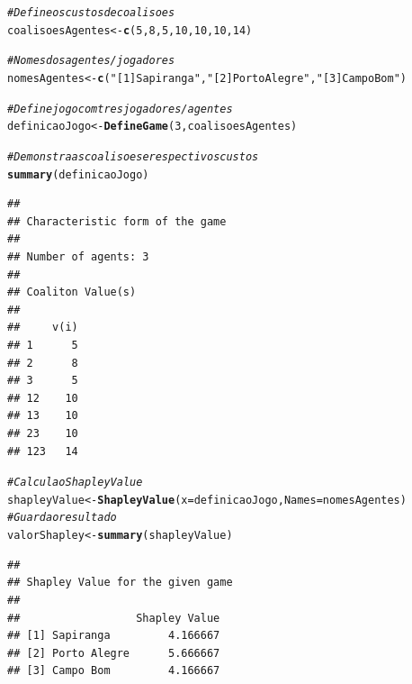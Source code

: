\documentclass[
	article,			        %
	11pt,				          %
	oneside,			        %
	a4paper,			        %
	english,			        %
	brazil,				        %
	sumario=tradicional
]{abntex2}\usepackage[]{graphicx}\usepackage[]{color}
\makeatletter
\newcommand{\hlnum}[1]{\textcolor[rgb]{0.686,0.059,0.569}{#1}}%
\newcommand{\hlstr}[1]{\textcolor[rgb]{0.192,0.494,0.8}{#1}}%
\newcommand{\hlcom}[1]{\textcolor[rgb]{0.678,0.584,0.686}{\textit{#1}}}%
\newcommand{\hlstd}[1]{\textcolor[rgb]{0.345,0.345,0.345}{#1}}%
\newcommand{\hlkwb}[1]{\textcolor[rgb]{0.69,0.353,0.396}{#1}}%
\newcommand{\hlkwc}[1]{\textcolor[rgb]{0.333,0.667,0.333}{#1}}%
\newcommand{\hlkwd}[1]{\textcolor[rgb]{0.737,0.353,0.396}{\textbf{#1}}}%
\newenvironment{kframe}{%
 \def\at@end@of@kframe{}%
 \ifinner\ifhmode%
  \def\at@end@of@kframe{\end{minipage}}%
  \begin{minipage}{\columnwidth}%
 \fi\fi%
 \def\FrameCommand##1{\hskip\@totalleftmargin \hskip-\fboxsep
 \colorbox{shadecolor}{##1}\hskip-\fboxsep
     \hskip-\linewidth \hskip-\@totalleftmargin \hskip\columnwidth}%
 \MakeFramed {\advance\hsize-\width
   \@totalleftmargin\z@ \linewidth\hsize
   \@setminipage}}%
 {\par\unskip\endMakeFramed%
 \at@end@of@kframe}
\newenvironment{knitrout}{}{} %
\makeatother
\begin{document}
\begin{knitrout}
\color{fgcolor}\begin{kframe}
\begin{alltt}
\hlcom{# Define os custos de coalisoes}
\hlstd{coalisoesAgentes} \hlkwb{<-} \hlkwd{c}\hlstd{(}\hlnum{5}\hlstd{,} \hlnum{8}\hlstd{,} \hlnum{5}\hlstd{,} \hlnum{10}\hlstd{,} \hlnum{10}\hlstd{,} \hlnum{10}\hlstd{,} \hlnum{14}\hlstd{)}

\hlcom{# Nomes dos agentes/jogadores}
\hlstd{nomesAgentes} \hlkwb{<-} \hlkwd{c}\hlstd{(}\hlstr{"[1] Sapiranga"}\hlstd{,}\hlstr{"[2] Porto Alegre"}\hlstd{,}\hlstr{"[3] Campo Bom"}\hlstd{)}

\hlcom{# Define jogo com tres jogadores/agentes}
\hlstd{definicaoJogo}   \hlkwb{<-} \hlkwd{DefineGame}\hlstd{(}\hlnum{3}\hlstd{, coalisoesAgentes)}

\hlcom{# Demonstra as coalisoes e respectivos custos}
\hlkwd{summary}\hlstd{(definicaoJogo)}
\end{alltt}
\begin{verbatim}
## 
## Characteristic form of the game 
## 
## Number of agents: 3 
## 
## Coaliton Value(s) 
## 
##     v(i)
## 1      5
## 2      8
## 3      5
## 12    10
## 13    10
## 23    10
## 123   14
\end{verbatim}
\begin{alltt}
\hlcom{# Calcula o Shapley Value}
\hlstd{shapleyValue} \hlkwb{<-} \hlkwd{ShapleyValue}\hlstd{(}\hlkwc{x} \hlstd{= definicaoJogo,} \hlkwc{Names} \hlstd{= nomesAgentes)}
\hlcom{# Guarda o resultado}
\hlstd{valorShapley} \hlkwb{<-} \hlkwd{summary}\hlstd{(shapleyValue)}
\end{alltt}
\begin{verbatim}
## 
## Shapley Value for the given game 
## 
##                  Shapley Value
## [1] Sapiranga         4.166667
## [2] Porto Alegre      5.666667
## [3] Campo Bom         4.166667
\end{verbatim}
\end{kframe}
\end{knitrout}
\end{document}
